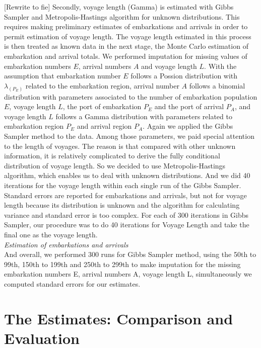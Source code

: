 \documentclass[preprint,12pt]{elsarticle}
\begin{document}
[Rewrite to fie] Secondly, voyage length (Gamma) is estimated with Gibbs Sampler and Metropolis-Hastings algorithm for unknown distributions. This requires making preliminary estimates of embarkations and arrivals in order to permit estimation of voyage length. The voyage length estimated in this process is then treated as known data in the next stage, the Monte Carlo estimation of embarkation and arrival totals. We performed imputation for missing values of embarkation numbers $E$, arrival numbers $A$ and voyage length $L$. With the assumption that embarkation number $E$ follows a Possion distribution with $λ_(P_E )$ related to the embarkation region, arrival number $A$ follows a binomial distribution with parameters associated to the number of embarkation population $E$, voyage length $L$, the port of embarkation $P_E$ and the port of arrival $P_A$, and voyage length $L$ follows a Gamma distribution with parameters related to embarkation region $P_E$ and arrival region $P_A$. Again we applied the Gibbs Sampler method to the data. Among those parameters, we paid special attention to the length of voyages. The reason is that compared with other unknown information, it is relatively complicated to derive the fully conditional distribution of voyage length. So we decided to use Metropolis-Hastings algorithm, which enables us to deal with unknown distributions. And we did 40 iterations for the voyage length within each single run of the Gibbs Sampler. \\

Standard errors are reported for embarkations and arrivals, but not for voyage length because its distribution is unknown and the algorithm for calculating variance and standard error is too complex. For each of 300 iterations in Gibbs Sampler, our procedure was to do 40 iterations for Voyage Length and take the final one as the voyage length. \\


\textit{Estimation of embarkations and arrivals}\\ 
And overall, we performed 300 runs for Gibbs Sampler method, using the 50th to 99th, 150th to 199th and 250th to 299th to make imputation for the missing embarkation numbers E, arrival numbers A, voyage length L, simultaneously we computed standard errors for our estimates.\\

\section{The Estimates: Comparison and Evaluation}
\end{document}
